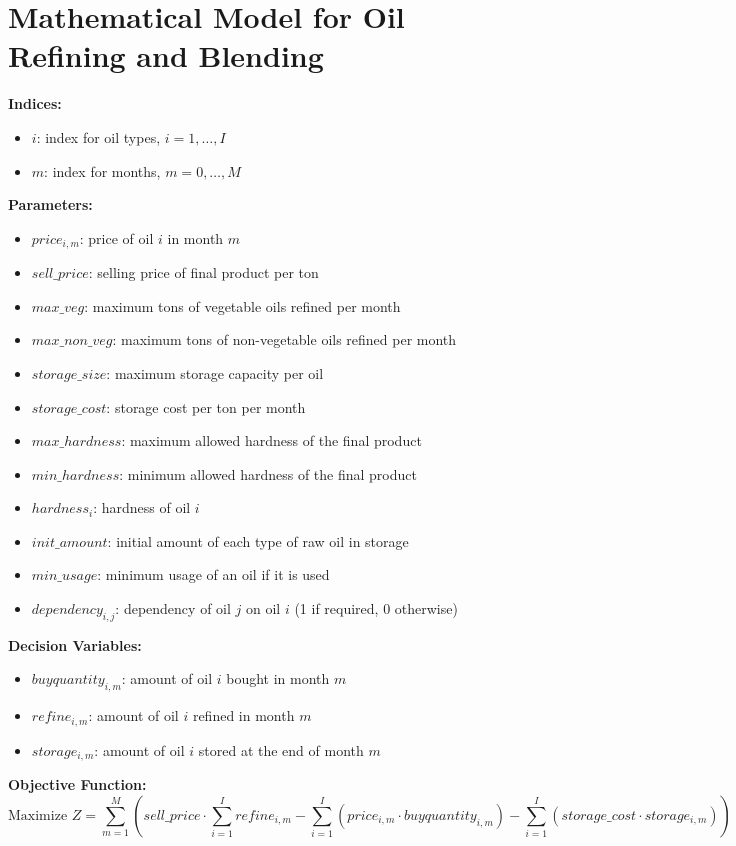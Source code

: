 \documentclass{article}
\begin{document}
\section*{Mathematical Model for Oil Refining and Blending}

\textbf{Indices:}
\begin{itemize}
    \item $i$: index for oil types, $i = 1, \ldots, I$
    \item $m$: index for months, $m = 0, \ldots, M$
\end{itemize}

\textbf{Parameters:}
\begin{itemize}
    \item $price_{i,m}$: price of oil $i$ in month $m$
    \item $sell\_price$: selling price of final product per ton
    \item $max\_veg$: maximum tons of vegetable oils refined per month
    \item $max\_non\_veg$: maximum tons of non-vegetable oils refined per month
    \item $storage\_size$: maximum storage capacity per oil
    \item $storage\_cost$: storage cost per ton per month
    \item $max\_hardness$: maximum allowed hardness of the final product
    \item $min\_hardness$: minimum allowed hardness of the final product
    \item $hardness_{i}$: hardness of oil $i$
    \item $init\_amount$: initial amount of each type of raw oil in storage
    \item $min\_usage$: minimum usage of an oil if it is used
    \item $dependency_{i,j}$: dependency of oil $j$ on oil $i$ (1 if required, 0 otherwise)
\end{itemize}

\textbf{Decision Variables:}
\begin{itemize}
    \item $buyquantity_{i,m}$: amount of oil $i$ bought in month $m$
    \item $refine_{i,m}$: amount of oil $i$ refined in month $m$
    \item $storage_{i,m}$: amount of oil $i$ stored at the end of month $m$
\end{itemize}

\textbf{Objective Function:}
\[
\text{Maximize } Z = \sum_{m=1}^{M} \left( sell\_price \cdot \sum_{i=1}^{I} refine_{i,m} - \sum_{i=1}^{I} (price_{i,m} \cdot buyquantity_{i,m}) - \sum_{i=1}^{I} (storage\_cost \cdot storage_{i,m}) \right)
\]
\end{document}
